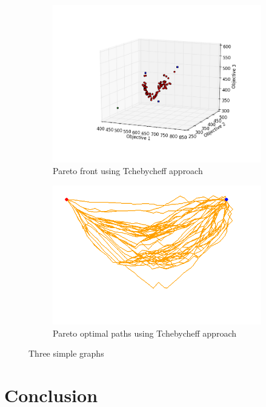\documentclass[conference]{IEEEtran}
\begin{document}
\begin{figure}
\begin{subfigure}[b]{0.45\linewidth}
		\centering
		\includegraphics[width=\textwidth]{fig/sim7-3obj/PF07-MORRT2.png}
		\caption{Pareto front using Tchebycheff approach}
		\label{fig:sim:many:pf:b}
	\end{subfigure} 
	\begin{subfigure}[b]{0.45\linewidth}
		\centering
		\includegraphics[width=\textwidth]{fig/sim7-3obj/MORRTstar02-ALL.png}
		\caption{Pareto optimal paths using Tchebycheff approach}
		\label{fig:sim:many:sols:b}
	\end{subfigure}
	\caption{Three simple graphs}
	\label{fig:sim:many}
\end{figure}

\section{Conclusion} 
\label{sec:conclusion}
\end{document}
